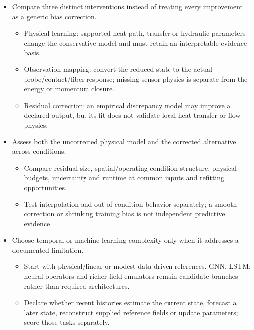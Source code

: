 \begin{itemize}[leftmargin=*]
\item Compare three distinct interventions instead of treating every improvement as a generic bias correction.
\begin{itemize}
\item Physical learning: supported heat-path, transfer or hydraulic parameters change the conservative model and must retain an interpretable evidence basis.
\item Observation mapping: convert the reduced state to the actual probe/\allowbreak{}contact/\allowbreak{}fiber response; missing sensor physics is separate from the energy or momentum closure.
\item Residual correction: an empirical discrepancy model may improve a declared output, but its fit does not validate local heat-transfer or flow physics.
\end{itemize}
\item Assess both the uncorrected physical model and the corrected alternative across conditions.
\begin{itemize}
\item Compare residual size, spatial/\allowbreak{}operating-condition structure, physical budgets, uncertainty and runtime at common inputs and refitting opportunities.
\item Test interpolation and out-of-condition behavior separately; a smooth correction or shrinking training bias is not independent predictive evidence.
\end{itemize}
\item Choose temporal or machine-learning complexity only when it addresses a documented limitation.
\begin{itemize}
\item Start with physical/\allowbreak{}linear or modest data-driven references. GNN, LSTM, neural operators and richer field emulators remain candidate branches rather than required architectures.
\item Declare whether recent histories estimate the current state, forecast a later state, reconstruct supplied reference fields or update parameters; score those tasks separately.
\end{itemize}


\end{itemize}
